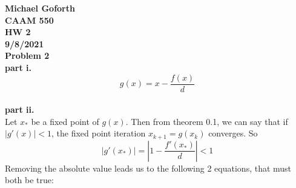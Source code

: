 \documentclass{article} %
\begin{document}
\textbf{Michael Goforth} \\
\textbf{CAAM 550} \\
\textbf{HW 2} \\
\textbf{9/8/2021} \\ 

\textbf{Problem 2} \\
\textbf{part i.} \\
\begin{equation}
g(x) = x - \frac{f(x)}{d}
\end{equation}
\\
\textbf{part ii.} \\
Let $x_*$ be a fixed point of $g(x)$.  Then from theorem 0.1, we can say that if $|g'(x)|<1$, the fixed point iteration $x_{k+1}=g(x_k)$ converges.  So
\begin{equation}
|g'(x_*)|=|1 - \frac{f'(x_*)}{d}|<1
\end{equation}
Removing the absolute value leads us to the following 2 equations, that must both be true:
\end{document}
